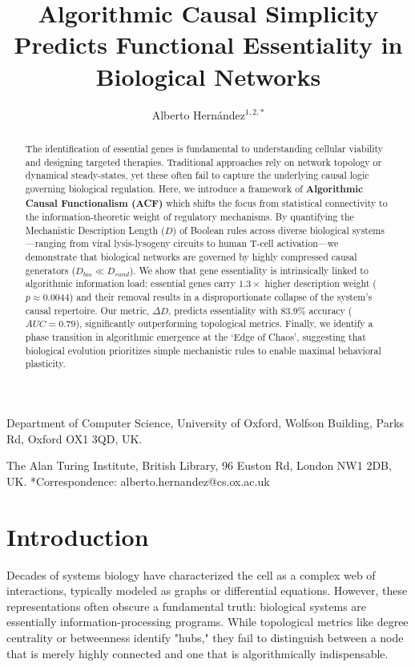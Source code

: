 \documentclass{nature}
\title{Algorithmic Causal Simplicity Predicts Functional Essentiality in Biological Networks}
\author{Alberto Hernández$^{1,2,*}$}
\begin{document}
\maketitle

\begin{affiliations}
 \item Department of Computer Science, University of Oxford, Wolfson Building, Parks Rd, Oxford OX1 3QD, UK.
 \item The Alan Turing Institute, British Library, 96 Euston Rd, London NW1 2DB, UK.
 *Correspondence: alberto.hernandez@cs.ox.ac.uk
\end{affiliations}

\begin{abstract}
The identification of essential genes is fundamental to understanding cellular viability and designing targeted therapies. Traditional approaches rely on network topology or dynamical steady-states, yet these often fail to capture the underlying causal logic governing biological regulation. Here, we introduce a framework of \textbf{Algorithmic Causal Functionalism (ACF)} which shifts the focus from statistical connectivity to the information-theoretic weight of regulatory mechanisms. By quantifying the Mechanistic Description Length ($D$) of Boolean rules across diverse biological systems—ranging from viral lysis-lysogeny circuits to human T-cell activation—we demonstrate that biological networks are governed by highly compressed causal generators ($D_{bio} \ll D_{rand}$). We show that gene essentiality is intrinsically linked to algorithmic information load: essential genes carry $1.3\times$ higher description weight ($p \approx 0.0044$) and their removal results in a disproportionate collapse of the system's causal repertoire. Our metric, $\Delta D$, predicts essentiality with 83.9\% accuracy ($AUC = 0.79$), significantly outperforming topological metrics. Finally, we identify a phase transition in algorithmic emergence at the `Edge of Chaos', suggesting that biological evolution prioritizes simple mechanistic rules to enable maximal behavioral plasticity.
\end{abstract}

\section*{Introduction}
Decades of systems biology have characterized the cell as a complex web of interactions, typically modeled as graphs or differential equations. However, these representations often obscure a fundamental truth: biological systems are essentially information-processing programs. While topological metrics like degree centrality or betweenness identify "hubs," they fail to distinguish between a node that is merely highly connected and one that is algorithmically indispensable. 
\end{document}
